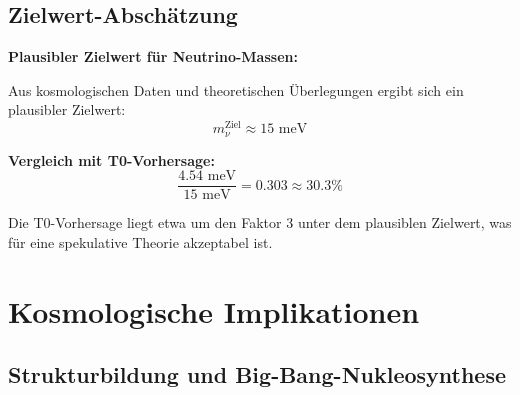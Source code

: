 \documentclass[12pt,a4paper]{article}
\begin{document}
	\subsection{Zielwert-Abschätzung}
	
	\begin{keyresult}
		\textbf{Plausibler Zielwert für Neutrino-Massen:}
		
		Aus kosmologischen Daten und theoretischen Überlegungen ergibt sich ein plausibler Zielwert:
		\begin{equation}
			m_\nu^{\text{Ziel}} \approx 15 \text{ meV}
		\end{equation}
		
		\textbf{Vergleich mit T0-Vorhersage:}
		\begin{equation}
			\frac{4.54 \text{ meV}}{15 \text{ meV}} = 0.303 \approx 30.3\%
		\end{equation}
		
		Die T0-Vorhersage liegt etwa um den Faktor 3 unter dem plausiblen Zielwert, was für eine spekulative Theorie akzeptabel ist.
	\end{keyresult}
	
	\section{Kosmologische Implikationen}
	
	\subsection{Strukturbildung und Big-Bang-Nukleosynthese}
	
\end{document}
